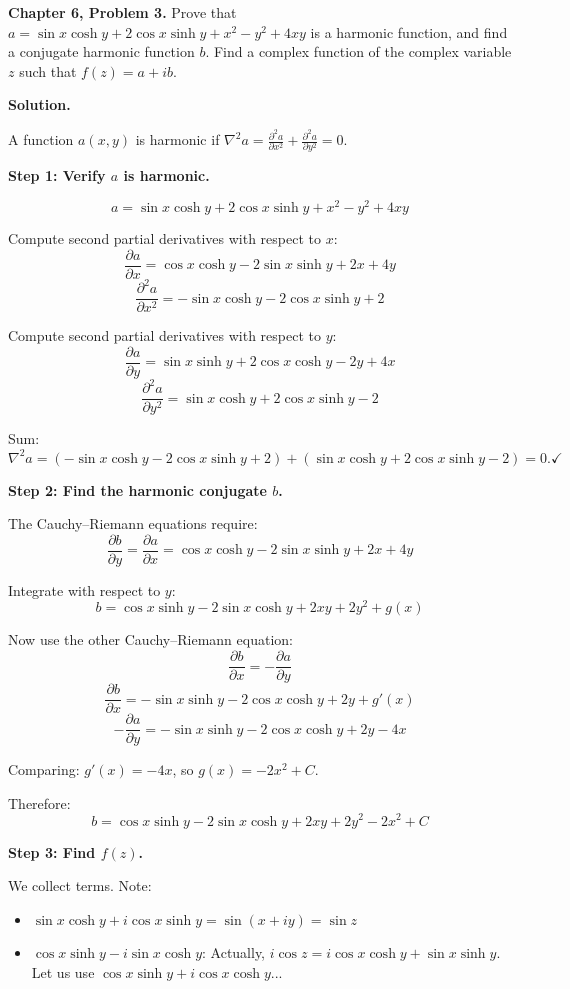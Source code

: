\documentclass[12pt]{article}
\begin{document}
\textbf{Chapter 6, Problem 3.} Prove that $a = \sin x \cosh y + 2\cos x \sinh y + x^2 - y^2 + 4xy$ is a harmonic function, and find a conjugate harmonic function $b$. Find a complex function of the complex variable $z$ such that $f(z) = a + ib$.

\bigskip
\textbf{Solution.}

A function $a(x,y)$ is harmonic if $\nabla^2 a = \frac{\partial^2 a}{\partial x^2} + \frac{\partial^2 a}{\partial y^2} = 0$.

\textbf{Step 1: Verify $a$ is harmonic.}

\[
a = \sin x \cosh y + 2\cos x \sinh y + x^2 - y^2 + 4xy
\]

Compute second partial derivatives with respect to $x$:
\[
\frac{\partial a}{\partial x} = \cos x \cosh y - 2\sin x \sinh y + 2x + 4y
\]
\[
\frac{\partial^2 a}{\partial x^2} = -\sin x \cosh y - 2\cos x \sinh y + 2
\]

Compute second partial derivatives with respect to $y$:
\[
\frac{\partial a}{\partial y} = \sin x \sinh y + 2\cos x \cosh y - 2y + 4x
\]
\[
\frac{\partial^2 a}{\partial y^2} = \sin x \cosh y + 2\cos x \sinh y - 2
\]

Sum:
\[
\nabla^2 a = (-\sin x\cosh y - 2\cos x\sinh y + 2) + (\sin x\cosh y + 2\cos x\sinh y - 2) = 0. \checkmark
\]

\textbf{Step 2: Find the harmonic conjugate $b$.}

The Cauchy--Riemann equations require:
\[
\frac{\partial b}{\partial y} = \frac{\partial a}{\partial x} = \cos x\cosh y - 2\sin x\sinh y + 2x + 4y
\]

Integrate with respect to $y$:
\[
b = \cos x\sinh y - 2\sin x\cosh y + 2xy + 2y^2 + g(x)
\]

Now use the other Cauchy--Riemann equation:
\[
\frac{\partial b}{\partial x} = -\frac{\partial a}{\partial y}
\]
\[
\frac{\partial b}{\partial x} = -\sin x\sinh y - 2\cos x\cosh y + 2y + g'(x)
\]
\[
-\frac{\partial a}{\partial y} = -\sin x\sinh y - 2\cos x\cosh y + 2y - 4x
\]

Comparing: $g'(x) = -4x$, so $g(x) = -2x^2 + C$.

Therefore:
\[
b = \cos x\sinh y - 2\sin x\cosh y + 2xy + 2y^2 - 2x^2 + C
\]

\textbf{Step 3: Find $f(z)$.}

We collect terms. Note:
\begin{itemize}
\item $\sin x\cosh y + i\cos x\sinh y = \sin(x+iy) = \sin z$
\item $\cos x\sinh y - i\sin x\cosh y$: Actually, $i\cos z = i\cos x\cosh y + \sin x\sinh y$. Let us use $\cos x\sinh y + i\cos x\cosh y$...
\end{itemize}
\end{document}
